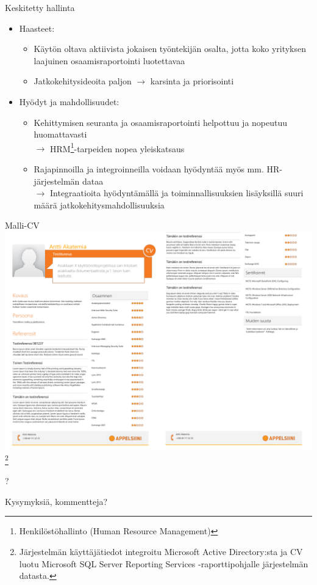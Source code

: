 \documentclass[first=purple,second=dblue,logo=redquo]{aaltoslides}
\newcommand\blfootnote[1]{%
  \begingroup
  \renewcommand\thefootnote{}\footnote{#1}%
  \addtocounter{footnote}{-1}%
  \endgroup
}
\begin{document}
\begin{frame}{Keskitetty hallinta}
\begin{itemize}
\item Haasteet:
\begin{itemize}
\item Käytön oltava aktiivista jokaisen työntekijän osalta, jotta koko yrityksen laajuinen osaamisraportointi luotettavaa
\item Jatkokehitysideoita paljon $\rightarrow$ karsinta ja priorisointi
\end{itemize}
\item Hyödyt ja mahdollisuudet:
\begin{itemize}
\item Kehittymisen seuranta ja osaamisraportointi helpottuu ja nopeutuu huomattavasti \\ $\rightarrow$ HRM\footnote{\tiny{Henkilöstöhallinto (Human Resource Management)}}-tarpeiden nopea yleiskatsaus
\item Rajapinnoilla ja integroinneilla voidaan hyödyntää myös mm. HR-järjestelmän dataa \\ $\rightarrow$ Integraatioita hyödyntämällä ja toiminnallisuuksien lisäyksillä suuri määrä jatkokehitysmahdollisuuksia
\end{itemize}
\end{itemize}
\end{frame}
{
\begin{frame}{Malli-CV}
\includegraphics[width=\textwidth]{Akatemia_sampleCV.png} \blfootnote{\tiny{Järjestelmän käyttäjätiedot integroitu Microsoft Active Directory:sta ja CV luotu Microsoft SQL Server Reporting Services -raporttipohjalle järjestelmän datasta.}}
\end{frame}
\begin{frame}{?}
\begin{center}
Kysymyksiä, kommentteja?
\end{center}
\end{frame}
}
\end{document}
